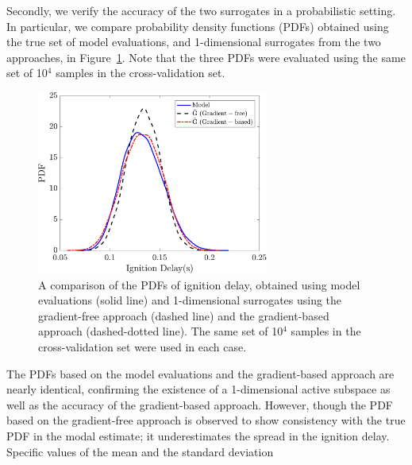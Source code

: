 Secondly, we verify the accuracy of the two surrogates in a probabilistic setting. In particular, we compare 
probability density functions (PDFs) obtained using the true set of model evaluations, and 1-dimensional
surrogates from the two approaches, in Figure~\ref{fig:pdf_33D}. Note that the three PDFs were evaluated 
using the same set of 10$^4$ samples in the cross-validation set. 
%
\begin{figure}[htbp]
\begin{center}
\includegraphics[width=3.0in]{./Figures/pdf_comp_id_1e4}
\end{center} 
\caption{A comparison of the PDFs of ignition delay, obtained using model 
evaluations (solid line) and 1-dimensional surrogates using the gradient-free approach (dashed line) and the gradient-based
approach (dashed-dotted line). The same set of 10$^4$ samples in the cross-validation set were used in each case.}
\label{fig:pdf_33D}
\end{figure}
%
%
%
The PDFs based on the model evaluations and the gradient-based approach are nearly identical, confirming
the existence of a 1-dimensional active subspace as well as the accuracy of the gradient-based approach. 
However, though the PDF based on the gradient-free approach is observed to show consistency with the true 
PDF in the modal
estimate; it underestimates the spread in the ignition delay. Specific values of the mean and the standard deviation
